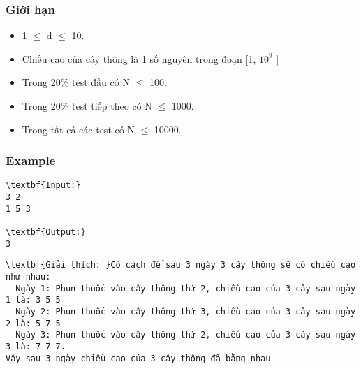 \subsubsection{Giới hạn}
\begin{itemize}
	\item 1  $\le$  d  $\le$  10.
	\item Chiều cao của cây thông là 1 số nguyên trong đoạn [1, $10^{9}$ ]
	\item Trong 20\% test đầu có N  $\le$  100.
	\item Trong 20\% test tiếp theo có N  $\le$  1000.
	\item Trong tất cả các test có N  $\le$  10000.
\end{itemize}

\subsubsection{Example}
\begin{verbatim}
\textbf{Input:}
3 2
1 5 3

\textbf{Output:}
3\end{verbatim}
\begin{verbatim}
\textbf{Giải thích: }Có cách để sau 3 ngày 3 cây thông sẽ có chiều cao như nhau:
- Ngày 1: Phun thuốc vào cây thông thứ 2, chiều cao của 3 cây sau ngày 1 là: 3 5 5
- Ngày 2: Phun thuốc vào cây thông thứ 3, chiều cao của 3 cây sau ngày 2 là: 5 7 5
- Ngày 3: Phun thuốc vào cây thông thứ 2, chiều cao của 3 cây sau ngày 3 là: 7 7 7.
Vậy sau 3 ngày chiều cao của 3 cây thông đã bằng nhau\end{verbatim}
